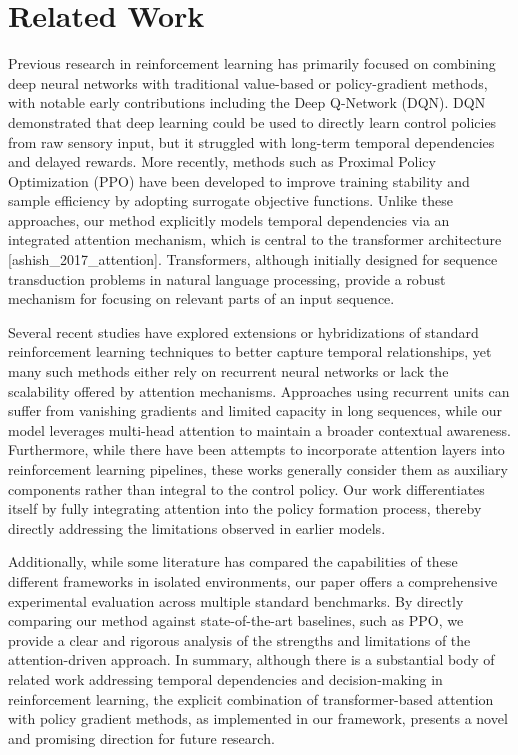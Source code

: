 \documentclass{article}
\begin{document}
\section{Related Work}
Previous research in reinforcement learning has primarily focused on combining deep neural networks with traditional value-based or policy-gradient methods, with notable early contributions including the Deep Q-Network (DQN). DQN demonstrated that deep learning could be used to directly learn control policies from raw sensory input, but it struggled with long-term temporal dependencies and delayed rewards. More recently, methods such as Proximal Policy Optimization (PPO) have been developed to improve training stability and sample efficiency by adopting surrogate objective functions. Unlike these approaches, our method explicitly models temporal dependencies via an integrated attention mechanism, which is central to the transformer architecture [ashish_2017_attention]. Transformers, although initially designed for sequence transduction problems in natural language processing, provide a robust mechanism for focusing on relevant parts of an input sequence.

Several recent studies have explored extensions or hybridizations of standard reinforcement learning techniques to better capture temporal relationships, yet many such methods either rely on recurrent neural networks or lack the scalability offered by attention mechanisms. Approaches using recurrent units can suffer from vanishing gradients and limited capacity in long sequences, while our model leverages multi-head attention to maintain a broader contextual awareness. Furthermore, while there have been attempts to incorporate attention layers into reinforcement learning pipelines, these works generally consider them as auxiliary components rather than integral to the control policy. Our work differentiates itself by fully integrating attention into the policy formation process, thereby directly addressing the limitations observed in earlier models.

Additionally, while some literature has compared the capabilities of these different frameworks in isolated environments, our paper offers a comprehensive experimental evaluation across multiple standard benchmarks. By directly comparing our method against state-of-the-art baselines, such as PPO, we provide a clear and rigorous analysis of the strengths and limitations of the attention-driven approach. In summary, although there is a substantial body of related work addressing temporal dependencies and decision-making in reinforcement learning, the explicit combination of transformer-based attention with policy gradient methods, as implemented in our framework, presents a novel and promising direction for future research.
\end{document}
